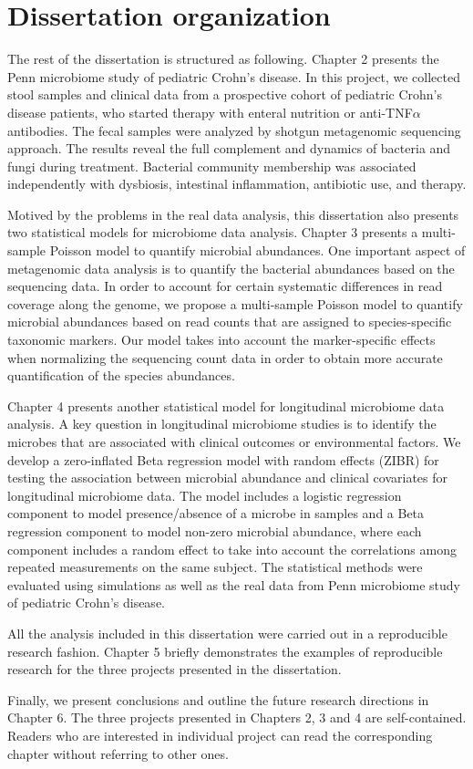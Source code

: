 \section{Dissertation organization }

The rest of the dissertation is structured as following. Chapter 2 presents the Penn microbiome study of pediatric Crohn's disease. In this project, we collected stool samples and clinical data from a prospective cohort of pediatric Crohn's disease patients, who started therapy with enteral nutrition or anti-TNF$\alpha$ antibodies. The fecal samples were analyzed by shotgun metagenomic sequencing approach. The results reveal the full complement and dynamics of bacteria and fungi during treatment. Bacterial community membership was associated independently with dysbiosis, intestinal inflammation, antibiotic use, and therapy.

Motived by the problems in the real data analysis, this dissertation also presents two statistical models for microbiome data analysis. Chapter 3 presents a multi-sample Poisson model to quantify microbial abundances. One important aspect of metagenomic data analysis is to quantify the bacterial abundances based on the sequencing data. In order to account for certain systematic differences in read coverage along the genome, we propose a multi-sample Poisson model to quantify microbial abundances based on read counts that are assigned to species-specific taxonomic markers. Our model takes into account the marker-specific effects when normalizing the sequencing count data in order to obtain more accurate quantification of the species abundances. 

Chapter 4 presents another statistical model  for longitudinal microbiome data analysis. A key question in longitudinal microbiome studies is to identify the microbes that are associated with clinical outcomes or environmental factors. We develop a zero-inflated Beta regression model with random effects (ZIBR) for testing the association between microbial abundance and clinical covariates for longitudinal microbiome data. The model includes a logistic regression component to model presence/absence of a microbe in samples and a Beta regression component to model non-zero microbial abundance, where each component includes a random effect to take into account the correlations among repeated measurements on the same subject. The statistical methods were evaluated using simulations as well as the real data from Penn microbiome study of pediatric Crohn's disease.

All the analysis included in this dissertation were carried out in a  reproducible research fashion. Chapter 5 briefly demonstrates the examples of reproducible research for the three projects presented in the dissertation.

Finally, we present conclusions and outline the future research directions in Chapter 6. The three projects presented in Chapters 2, 3 and 4 are self-contained. Readers who are interested in individual project can read the corresponding chapter without referring to other ones.
